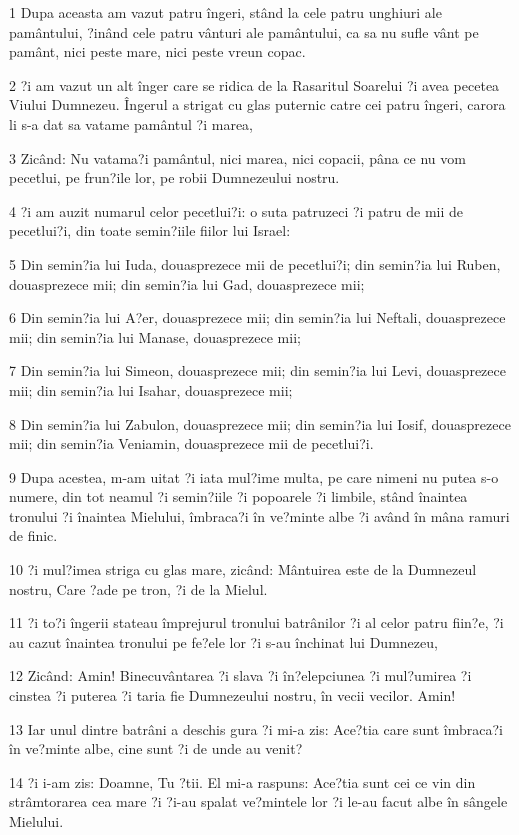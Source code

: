 \par 1 Dupa aceasta am vazut patru îngeri, stând la cele patru unghiuri ale pamântului, ?inând cele patru vânturi ale pamântului, ca sa nu sufle vânt pe pamânt, nici peste mare, nici peste vreun copac.
\par 2 ?i am vazut un alt înger care se ridica de la Rasaritul Soarelui ?i avea pecetea Viului Dumnezeu. Îngerul a strigat cu glas puternic catre cei patru îngeri, carora li s-a dat sa vatame pamântul ?i marea,
\par 3 Zicând: Nu vatama?i pamântul, nici marea, nici copacii, pâna ce nu vom pecetlui, pe frun?ile lor, pe robii Dumnezeului nostru.
\par 4 ?i am auzit numarul celor pecetlui?i: o suta patruzeci ?i patru de mii de pecetlui?i, din toate semin?iile fiilor lui Israel:
\par 5 Din semin?ia lui Iuda, douasprezece mii de pecetlui?i; din semin?ia lui Ruben, douasprezece mii; din semin?ia lui Gad, douasprezece mii;
\par 6 Din semin?ia lui A?er, douasprezece mii; din semin?ia lui Neftali, douasprezece mii; din semin?ia lui Manase, douasprezece mii;
\par 7 Din semin?ia lui Simeon, douasprezece mii; din semin?ia lui Levi, douasprezece mii; din semin?ia lui Isahar, douasprezece mii;
\par 8 Din semin?ia lui Zabulon, douasprezece mii; din semin?ia lui Iosif, douasprezece mii; din semin?ia Veniamin, douasprezece mii de pecetlui?i.
\par 9 Dupa acestea, m-am uitat ?i iata mul?ime multa, pe care nimeni nu putea s-o numere, din tot neamul ?i semin?iile ?i popoarele ?i limbile, stând înaintea tronului ?i înaintea Mielului, îmbraca?i în ve?minte albe ?i având în mâna ramuri de finic.
\par 10 ?i mul?imea striga cu glas mare, zicând: Mântuirea este de la Dumnezeul nostru, Care ?ade pe tron, ?i de la Mielul.
\par 11 ?i to?i îngerii stateau împrejurul tronului batrânilor ?i al celor patru fiin?e, ?i au cazut înaintea tronului pe fe?ele lor ?i s-au închinat lui Dumnezeu,
\par 12 Zicând: Amin! Binecuvântarea ?i slava ?i în?elepciunea ?i mul?umirea ?i cinstea ?i puterea ?i taria fie Dumnezeului nostru, în vecii vecilor. Amin!
\par 13 Iar unul dintre batrâni a deschis gura ?i mi-a zis: Ace?tia care sunt îmbraca?i în ve?minte albe, cine sunt ?i de unde au venit?
\par 14 ?i i-am zis: Doamne, Tu ?tii. El mi-a raspuns: Ace?tia sunt cei ce vin din strâmtorarea cea mare ?i ?i-au spalat ve?mintele lor ?i le-au facut albe în sângele Mielului.

